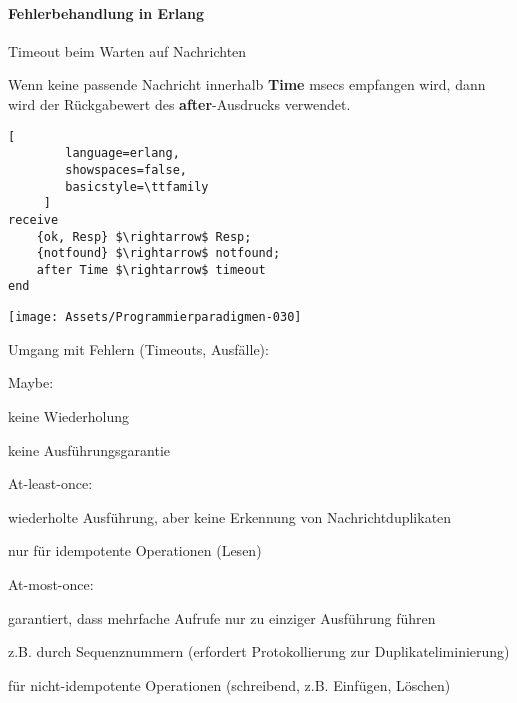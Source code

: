 \documentclass[10pt]{article}
\begin{document}
\paragraph{Fehlerbehandlung in Erlang}
\begin{itemize*}
  \item Timeout beim Warten auf Nachrichten
  \item Wenn keine passende Nachricht innerhalb \textbf{Time} msecs empfangen wird, dann wird der Rückgabewert des \textbf{after}-Ausdrucks verwendet.
\end{itemize*}
\begin{lstlisting}[
        language=erlang,
        showspaces=false,
        basicstyle=\ttfamily
     ]
receive
    {ok, Resp} $\rightarrow$ Resp;
    {notfound} $\rightarrow$ notfound;
    after Time $\rightarrow$ timeout
end
\end{lstlisting}
\begin{center}
  \centering
  \texttt{[image: Assets/Programmierparadigmen-030]}
  
  Umgang mit Fehlern (Timeouts, Ausfälle):
  \begin{itemize*}
    \item Maybe:
    \begin{itemize*}
      \item keine Wiederholung
      \item keine Ausführungsgarantie
    \end{itemize*}
    \item At-least-once:
    \begin{itemize*}
      \item wiederholte Ausführung, aber keine Erkennung von Nachrichtduplikaten
      \item nur für idempotente Operationen (Lesen)
    \end{itemize*}
    \item At-most-once:
    \begin{itemize*}
      \item garantiert, dass mehrfache Aufrufe nur zu einziger Ausführung führen
      \item z.B. durch Sequenznummern (erfordert Protokollierung zur Duplikateliminierung)
      \item für nicht-idempotente Operationen (schreibend, z.B. Einfügen, Löschen)
    \end{itemize*}
  \end{itemize*}
  
\end{center}
\end{document}
